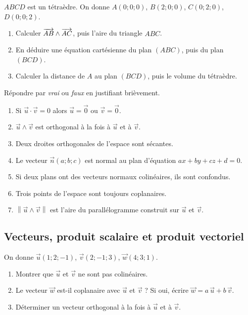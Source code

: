 $ABCD$ est un tétraèdre. On donne $A(0;0;0)$, $B(2;0;0)$, $C(0;2;0)$,
$D(0;0;2)$.
\begin{enumerate}
	\item Calculer $\overrightarrow{AB} \wedge \overrightarrow{AC}$, puis l'aire du triangle $ABC$.
	\item En déduire une équation cartésienne du plan $(ABC)$, puis du plan $(BCD)$.
	\item Calculer la distance de $A$ au plan $(BCD)$, puis le volume du
	tétraèdre.
\end{enumerate}

Répondre par \emph{vrai} ou \emph{faux} en justifiant brièvement.
\begin{enumerate}
	\item Si $\vec u \cdot \vec v = 0$ alors $\vec u = \vec 0$ ou $\vec v = \vec 0$.
	\item $\vec u \wedge \vec v$ est orthogonal à la fois à $\vec u$ et à $\vec v$.
	\item Deux droites orthogonales de l'espace sont sécantes.
	\item Le vecteur $\vec n(a;b;c)$ est normal au plan d'équation $ax+by+cz+d=0$.
	\item Si deux plans ont des vecteurs normaux colinéaires, ils sont confondus.
	\item Trois points de l'espace sont toujours coplanaires.
	\item $\left\|\vec u \wedge \vec v\right\|$ est l'aire du parallélogramme
	construit sur $\vec u$ et $\vec v$.
\end{enumerate}

\subsection{Vecteurs, produit scalaire et produit vectoriel}

On donne $\vec u(1;2;-1)$, $\vec v(2;-1;3)$, $\vec w(4;3;1)$.
\begin{enumerate}
	\item Montrer que $\vec u$ et $\vec v$ ne sont pas colinéaires.
	\item Le vecteur $\vec w$ est-il coplanaire avec $\vec u$ et $\vec v$ ?
	Si oui, écrire $\vec w = a\,\vec u + b\,\vec v$.
	\item Déterminer un vecteur orthogonal à la fois à $\vec u$ et à $\vec v$.
\end{enumerate}

